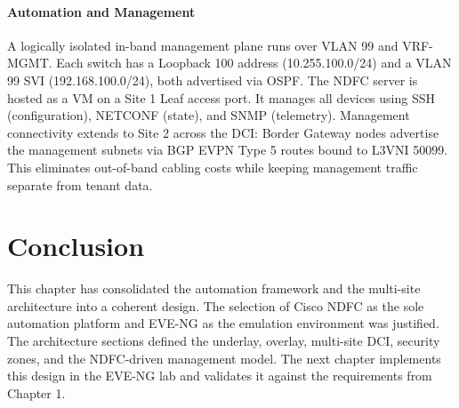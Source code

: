 \paragraph{Automation and Management}
A logically isolated in-band management plane runs over VLAN 99 and VRF-MGMT. Each switch has a Loopback 100 address (10.255.100.0/24) and a VLAN 99 SVI (192.168.100.0/24), both advertised via OSPF. The NDFC server is hosted as a VM on a Site 1 Leaf access port. It manages all devices using SSH (configuration), NETCONF (state), and SNMP (telemetry). Management connectivity extends to Site 2 across the DCI: Border Gateway nodes advertise the management subnets via BGP EVPN Type 5 routes bound to L3VNI 50099. This eliminates out-of-band cabling costs while keeping management traffic separate from tenant data.

\section{Conclusion}
This chapter has consolidated the automation framework and the multi-site architecture into a coherent design. The selection of Cisco NDFC as the sole automation platform and EVE-NG as the emulation environment was justified. The architecture sections defined the underlay, overlay, multi-site DCI, security zones, and the NDFC-driven management model. The next chapter implements this design in the EVE-NG lab and validates it against the requirements from Chapter 1.